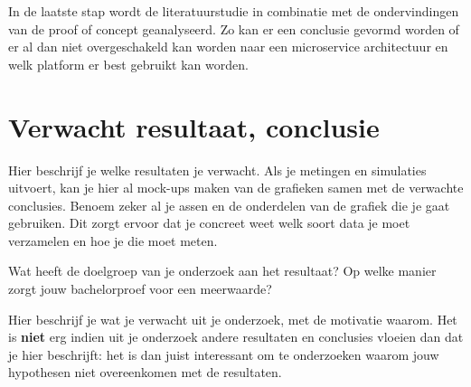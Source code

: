 In de laatste stap wordt de literatuurstudie in combinatie met de ondervindingen van de proof of concept geanalyseerd. Zo kan er een conclusie gevormd worden of er al dan niet overgeschakeld kan worden naar een microservice architectuur en welk platform er best gebruikt kan worden.
%
%
%
%
%

\section{Verwacht resultaat, conclusie}%
\label{sec:verwachte_resultaten}

Hier beschrijf je welke resultaten je verwacht. Als je metingen en simulaties uitvoert, kan je hier al mock-ups maken van de grafieken samen met de verwachte conclusies. Benoem zeker al je assen en de onderdelen van de grafiek die je gaat gebruiken. Dit zorgt ervoor dat je concreet weet welk soort data je moet verzamelen en hoe je die moet meten.

Wat heeft de doelgroep van je onderzoek aan het resultaat? Op welke manier zorgt jouw bachelorproef voor een meerwaarde?

Hier beschrijf je wat je verwacht uit je onderzoek, met de motivatie waarom. Het is \textbf{niet} erg indien uit je onderzoek andere resultaten en conclusies vloeien dan dat je hier beschrijft: het is dan juist interessant om te onderzoeken waarom jouw hypothesen niet overeenkomen met de resultaten.

